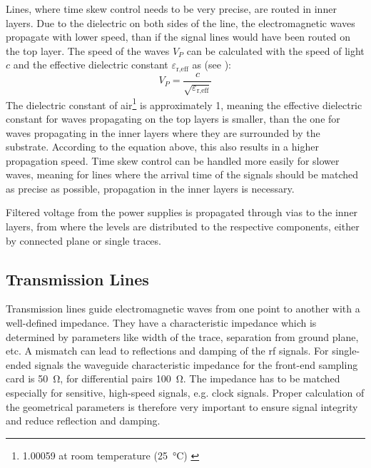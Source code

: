 Lines, where time skew control needs to be very precise, are routed in inner layers. 
Due to the dielectric on both sides of the line, the electromagnetic waves propagate with lower speed, than if the signal lines would have been routed on the top layer.
The speed of the waves $V_P$ can be calculated with the speed of light $c$ and the effective dielectric constant $\varepsilon_\text{r,eff}$ as (see \cite{thierauf}):
\begin{equation}
	V_P = \frac{c}{\sqrt{\varepsilon_\text{r,eff}}}
\end{equation}
The dielectric constant of air\footnote{1.00059 at room temperature (\SI{25}{\degreeCelsius}) \cite{dielectric}} is approximately 1, meaning the effective dielectric constant for waves propagating on the top layers is smaller, than the one for waves propagating in the inner layers where they are surrounded by the substrate.
According to the equation above, this also results in a higher propagation speed. 
Time skew control can be handled more easily for slower waves, meaning for lines where the arrival time of the signals should be matched as precise as possible, propagation in the inner layers is necessary.

Filtered voltage from the power supplies is propagated through vias to the inner layers, from where the levels are distributed to the respective components, either by connected plane or single traces.


\clearpage
\subsection{Transmission Lines}
Transmission lines guide electromagnetic waves from one point to another with a well-defined impedance. 
They have a characteristic impedance which is determined by parameters like width of the trace, separation from ground plane, etc.  
A mismatch can lead to reflections and damping of the \gls{rf} signals.
For single-ended signals the waveguide characteristic impedance for the front-end sampling card is \SI{50}{\ohm}, for differential pairs \SI{100}{\ohm}.
The impedance has to be matched especially for sensitive, high-speed signals, e.g. clock signals. 
Proper calculation of the geometrical parameters is therefore very important to ensure signal integrity and reduce reflection and damping. 

